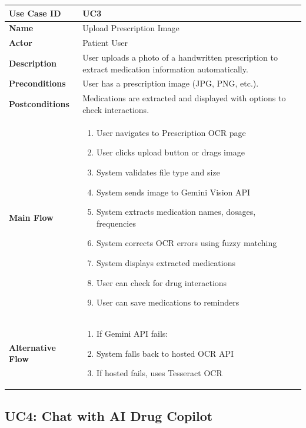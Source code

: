 \documentclass[12pt,a4paper]{report}
\begin{document}
\begin{tabularx}{\textwidth}{|l|X|}
\hline
\textbf{Use Case ID} & UC3 \\
\hline
\textbf{Name} & Upload Prescription Image \\
\hline
\textbf{Actor} & Patient User \\
\hline
\textbf{Description} & User uploads a photo of a handwritten prescription to extract medication information automatically. \\
\hline
\textbf{Preconditions} & User has a prescription image (JPG, PNG, etc.). \\
\hline
\textbf{Postconditions} & Medications are extracted and displayed with options to check interactions. \\
\hline
\textbf{Main Flow} & 
\begin{enumerate}[nosep]
    \item User navigates to Prescription OCR page
    \item User clicks upload button or drags image
    \item System validates file type and size
    \item System sends image to Gemini Vision API
    \item System extracts medication names, dosages, frequencies
    \item System corrects OCR errors using fuzzy matching
    \item System displays extracted medications
    \item User can check for drug interactions
    \item User can save medications to reminders
\end{enumerate} \\
\hline
\textbf{Alternative Flow} & 
\begin{enumerate}[nosep]
    \item[4a.] If Gemini API fails:
    \item[4a.1] System falls back to hosted OCR API
    \item[4a.2] If hosted fails, uses Tesseract OCR
\end{enumerate} \\
\hline
\end{tabularx}

\subsection{UC4: Chat with AI Drug Copilot}
\end{document}

